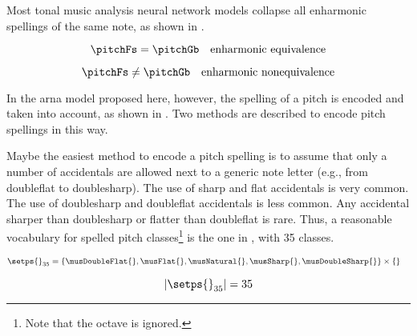 
Most tonal music analysis neural network models collapse all
enharmonic spellings of the same note, as shown in
.

\begin{equation}
    \label{eq:enharmonic_equivalence}
    \pitchFs = \pitchGb \quad \text{enharmonic equivalence}
\end{equation}

\begin{equation}
    \label{eq:enharmonic_nonequivalence}
    \pitchFs \neq \pitchGb \quad \text{enharmonic nonequivalence}
\end{equation}

In the \gls{arna} model proposed here, however, the spelling
of a pitch is encoded and taken into account, as shown in
. Two methods are described
to encode pitch spellings in this way.



Maybe the easiest method to encode a pitch spelling is to
assume that only a number of accidentals are allowed next to
a generic note letter (e.g., from \gls{doubleflat} to
\gls{doublesharp}). The use of \gls{sharp} and \gls{flat}
accidentals is very common. The use of \gls{doublesharp} and
\gls{doubleflat} accidentals is less common. Any accidental
sharper than \gls{doublesharp} or flatter than
\gls{doubleflat} is rare. Thus, a reasonable vocabulary for
spelled pitch classes\footnote{Note that the octave is
ignored.} is the one in , with 35
classes.

\begin{equation}
    \label{eq:pitch_spelling_35}
    \begin{split}
    \setps{}_{35} &= \{\musDoubleFlat{}, \musFlat{}, 
    \musNatural{}, \musSharp{}, \musDoubleSharp{} \}
    \times 
    \{ \}
    \end{split}
\end{equation}

\begin{equation}
    \label{eq:pitch_spelling_35_magnitude}
    | \setps{}_{35} | = 35
\end{equation}


